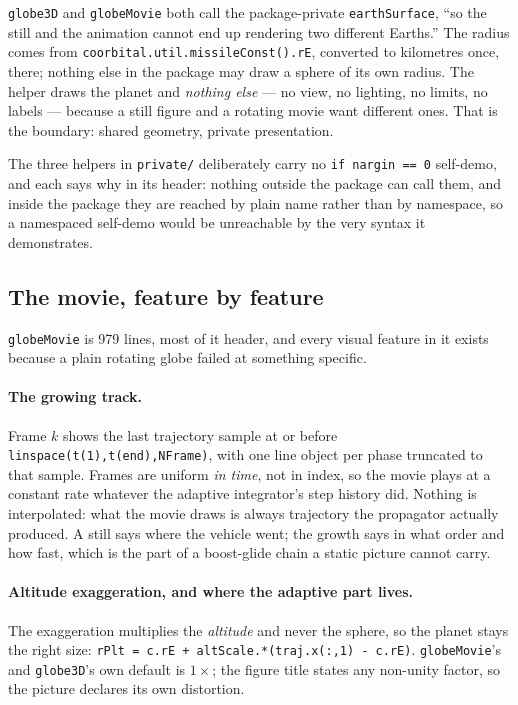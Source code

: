 \documentclass[11pt]{article}
\newcommand{\code}[1]{\texttt{#1}}
\begin{document}
\code{globe3D} and \code{globeMovie} both call the package-private
\code{earthSurface}, ``so the still and the animation cannot end up rendering
two different Earths.'' The radius comes from
\code{coorbital.util.missileConst().rE}, converted to kilometres once, there;
nothing else in the package may draw a sphere of its own radius. The helper
draws the planet and \emph{nothing else} --- no view, no lighting, no limits,
no labels --- because a still figure and a rotating movie want different ones.
That is the boundary: shared geometry, private presentation.

The three helpers in \code{private/} deliberately carry no
\code{if nargin == 0} self-demo, and each says why in its header: nothing
outside the package can call them, and inside the package they are reached by
plain name rather than by namespace, so a namespaced self-demo would be
unreachable by the very syntax it demonstrates.

\subsection{The movie, feature by feature}

\code{globeMovie} is 979 lines, most of it header, and every visual feature in
it exists because a plain rotating globe failed at something specific.

\paragraph{The growing track.} Frame $k$ shows the last trajectory sample at or
before \code{linspace(t(1),t(end),NFrame)}, with one line object per phase
truncated to that sample. Frames are uniform \emph{in time}, not in index, so
the movie plays at a constant rate whatever the adaptive integrator's step
history did. Nothing is interpolated: what the movie draws is always
trajectory the propagator actually produced. A still says where the vehicle
went; the growth says in what order and how fast, which is the part of a
boost-glide chain a static picture cannot carry.

\paragraph{Altitude exaggeration, and where the adaptive part lives.} The
exaggeration multiplies the \emph{altitude} and never the sphere, so the planet
stays the right size:
\code{rPlt = c.rE + altScale.*(traj.x(:,1) - c.rE)}. \code{globeMovie}'s and
\code{globe3D}'s own default is $1\times$; the figure title states any non-unity
factor, so the picture declares its own distortion.
\end{document}
